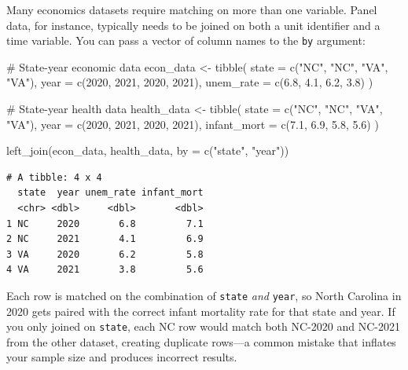 \documentclass[
  letterpaper,
  DIV=11,
  numbers=noendperiod]{scrreprt}
\newenvironment{Shaded}{\begin{snugshade}}{\end{snugshade}}
\newcommand{\AttributeTok}[1]{\textcolor[rgb]{0.40,0.45,0.13}{#1}}
\newcommand{\CommentTok}[1]{\textcolor[rgb]{0.37,0.37,0.37}{#1}}
\newcommand{\DecValTok}[1]{\textcolor[rgb]{0.68,0.00,0.00}{#1}}
\newcommand{\FloatTok}[1]{\textcolor[rgb]{0.68,0.00,0.00}{#1}}
\newcommand{\FunctionTok}[1]{\textcolor[rgb]{0.28,0.35,0.67}{#1}}
\newcommand{\NormalTok}[1]{\textcolor[rgb]{0.00,0.23,0.31}{#1}}
\newcommand{\OtherTok}[1]{\textcolor[rgb]{0.00,0.23,0.31}{#1}}
\newcommand{\StringTok}[1]{\textcolor[rgb]{0.13,0.47,0.30}{#1}}
\begin{document}
Many economics datasets require matching on more than one variable.
Panel data, for instance, typically needs to be joined on both a unit
identifier and a time variable. You can pass a vector of column names to
the \texttt{by} argument:

\begin{Shaded}
\begin{Highlighting}[]
\CommentTok{\# State{-}year economic data}
\NormalTok{econ\_data }\OtherTok{\textless{}{-}} \FunctionTok{tibble}\NormalTok{(}
    \AttributeTok{state =} \FunctionTok{c}\NormalTok{(}\StringTok{"NC"}\NormalTok{, }\StringTok{"NC"}\NormalTok{, }\StringTok{"VA"}\NormalTok{, }\StringTok{"VA"}\NormalTok{),}
    \AttributeTok{year  =} \FunctionTok{c}\NormalTok{(}\DecValTok{2020}\NormalTok{, }\DecValTok{2021}\NormalTok{, }\DecValTok{2020}\NormalTok{, }\DecValTok{2021}\NormalTok{),}
    \AttributeTok{unem\_rate =} \FunctionTok{c}\NormalTok{(}\FloatTok{6.8}\NormalTok{, }\FloatTok{4.1}\NormalTok{, }\FloatTok{6.2}\NormalTok{, }\FloatTok{3.8}\NormalTok{)}
\NormalTok{)}

\CommentTok{\# State{-}year health data}
\NormalTok{health\_data }\OtherTok{\textless{}{-}} \FunctionTok{tibble}\NormalTok{(}
    \AttributeTok{state =} \FunctionTok{c}\NormalTok{(}\StringTok{"NC"}\NormalTok{, }\StringTok{"NC"}\NormalTok{, }\StringTok{"VA"}\NormalTok{, }\StringTok{"VA"}\NormalTok{),}
    \AttributeTok{year  =} \FunctionTok{c}\NormalTok{(}\DecValTok{2020}\NormalTok{, }\DecValTok{2021}\NormalTok{, }\DecValTok{2020}\NormalTok{, }\DecValTok{2021}\NormalTok{),}
    \AttributeTok{infant\_mort =} \FunctionTok{c}\NormalTok{(}\FloatTok{7.1}\NormalTok{, }\FloatTok{6.9}\NormalTok{, }\FloatTok{5.8}\NormalTok{, }\FloatTok{5.6}\NormalTok{)}
\NormalTok{)}

\FunctionTok{left\_join}\NormalTok{(econ\_data, health\_data, }\AttributeTok{by =} \FunctionTok{c}\NormalTok{(}\StringTok{"state"}\NormalTok{, }\StringTok{"year"}\NormalTok{))}
\end{Highlighting}
\end{Shaded}

\begin{verbatim}
# A tibble: 4 x 4
  state  year unem_rate infant_mort
  <chr> <dbl>     <dbl>       <dbl>
1 NC     2020       6.8         7.1
2 NC     2021       4.1         6.9
3 VA     2020       6.2         5.8
4 VA     2021       3.8         5.6
\end{verbatim}

Each row is matched on the combination of \texttt{state} \emph{and}
\texttt{year}, so North Carolina in 2020 gets paired with the correct
infant mortality rate for that state and year. If you only joined on
\texttt{state}, each NC row would match both NC-2020 and NC-2021 from
the other dataset, creating duplicate rows---a common mistake that
inflates your sample size and produces incorrect results.
\end{document}
